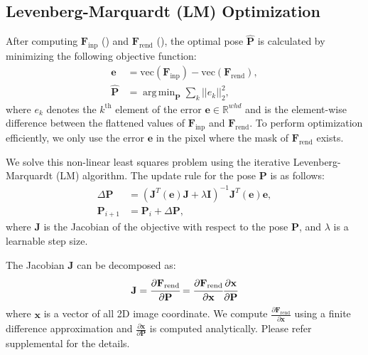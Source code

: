 \documentclass[10pt,twocolumn,letterpaper]{article}
\DeclareMathOperator*{\argmin}{arg\,min}
\begin{document}
\subsection{Levenberg-Marquardt (LM) Optimization}
After computing $\mathbf{F}_\text{inp}$ () and $\mathbf{F}_\text{rend}$ (), the optimal pose $\mathbf{\hat{P}}$ is calculated by minimizing the following objective function:
\begin{align}
    \mathbf{e} &= \text{vec}(\mathbf{F}_\text{inp}) - \text{vec}(\mathbf{F}_\text{rend}), \\
    \mathbf{\hat{P}} &=\argmin_{\mathbf{P}} \sum_{k} ||e_k||^2_2,
  \label{eq:error_lm}
\end{align}
where $e_k$ denotes the $k^{\text{th}}$ element of the error $\mathbf{e} \in \mathbb{R}^{whd}$ and is the element-wise difference between the flattened values of $\mathbf{F}_\text{inp}$ and $\mathbf{F}_\text{rend}$. To perform optimization efficiently, we only use the error $\mathbf{e}$ in the pixel where the mask of $\mathbf{F}_\text{rend}$ exists.

We solve this non-linear least squares problem using the iterative Levenberg-Marquardt (LM) algorithm. The update rule for the pose $\mathbf{P}$ is as follows:
\begin{align}
  \Delta \mathbf{P} 
  &= (\mathbf{J}^T \left(\mathbf{e}\right) \mathbf{J} + \lambda \mathbf{I})^{-1} \mathbf{J}^T \left(\mathbf{e}\right) \mathbf{e},
  \label{eq:lavenberg}
\\
\mathbf{P}_{i+1} &= \mathbf{P}_i + \Delta \mathbf{P},
\label{eq:lavenberg_update}
\end{align}
where $\mathbf{J}$ is the Jacobian of the objective with respect to the pose $\mathbf{P}$, and $\lambda$ is a learnable step size.

The Jacobian $\mathbf{J}$ can be decomposed as:
\begin{equation}
  \mathbf{J} =
  \cfrac{\partial \mathbf{F}_\text{rend}}{\partial \mathbf{P}}
  =
  \cfrac{\partial \mathbf{F}_\text{rend}}{\partial \mathbf{x}}
  \cfrac{\partial \mathbf{x}}{\partial \mathbf{P}}
  \label{eq:jacobian}
\end{equation}
where $\mathbf{x}$ is a vector of all 2D image coordinate. We compute $\frac{\partial \mathbf{F}_\text{rend}}{\partial \mathbf{x}}$ using a finite difference approximation and $\frac{\partial \mathbf{x}}{\partial \mathbf{P}}$ is computed analytically. Please refer supplemental for the details. 
\end{document}

